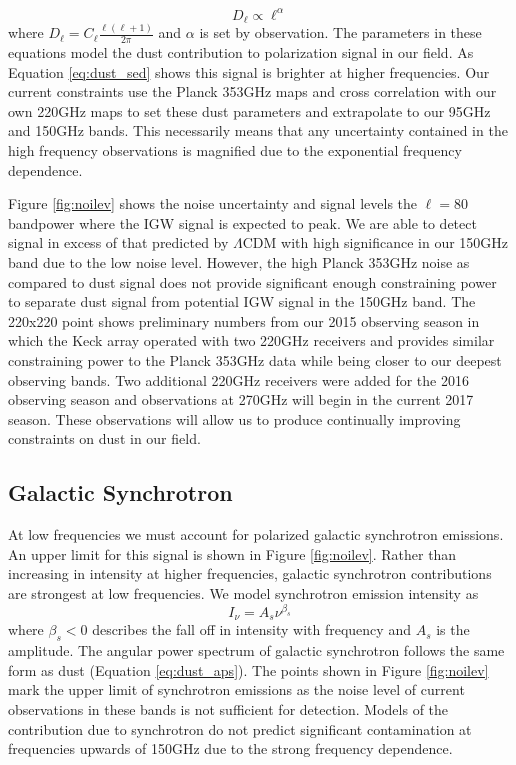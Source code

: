 \documentclass[12pt]{article}
\begin{document}
\begin{equation}
	D_\ell \propto \ell^\alpha
	\label{eq:dust_aps}
\end{equation}
where $D_\ell=C_\ell \frac{\ell(\ell +1)}{2\pi}$ and $\alpha$ is set
by observation. The parameters in these
equations model the dust contribution to polarization signal in our field. As
Equation \ref{eq:dust_sed} shows this signal is brighter at higher
frequencies. Our current constraints use the Planck 353GHz maps and cross
correlation with our own 220GHz maps to set these dust parameters and
extrapolate to our 95GHz and 150GHz bands. This necessarily means that any
uncertainty contained in the high frequency observations is magnified due to
the exponential frequency dependence.

Figure \ref{fig:noilev} shows the noise uncertainty and signal levels
the $\ell=80$ bandpower where the IGW signal is expected to peak. We are able
to detect signal in excess of that predicted by $\Lambda$CDM with high
significance in our 150GHz band due to the low noise level.
However, the high Planck 353GHz noise as compared to dust signal does not provide
significant enough constraining power to separate dust signal from potential
IGW signal in the 150GHz band. The 220x220 point shows preliminary numbers
from our 2015 observing season in which the Keck array operated with two
220GHz receivers and provides similar constraining power to the Planck 353GHz
data while being closer to our deepest observing bands. Two additional 220GHz
receivers were added for the 2016 observing season and observations at 270GHz
will begin in the current 2017 season. These observations will allow us to
produce continually improving constraints on dust in our field.


\subsection{Galactic Synchrotron}
At low frequencies we must account for polarized galactic synchrotron
emissions. An upper limit for this signal is shown in Figure
\ref{fig:noilev}. Rather than increasing in intensity at higher frequencies,
 galactic synchrotron contributions are strongest at low
frequencies. We model synchrotron emission intensity as
\begin{equation}
	I_\nu = A_s \nu^{\beta _s}
	\label{eq:synch_sed}
\end{equation}
where $\beta _s < 0$ describes the fall off in intensity with frequency and
$A_s$ is the amplitude. The angular power spectrum of galactic synchrotron
follows the same form as dust (Equation \ref{eq:dust_aps}). The points shown
in Figure \ref{fig:noilev} mark the upper limit of synchrotron emissions as
the noise level of current observations in these bands is not sufficient for
detection. Models of the contribution due to synchrotron do not predict
significant contamination at frequencies upwards of 150GHz due to the strong
frequency dependence.
\end{document}
